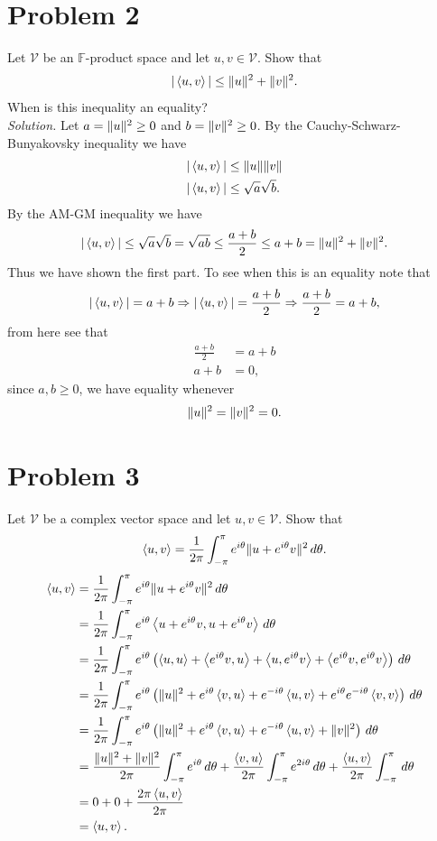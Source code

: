 \documentclass[12pt]{article}
\begin{document}
\section*{Problem 2}
Let $\mathcal{V}$ be an $\mathbb{F}$-product space and let $u, v \in \mathcal{V}$. Show that
\[
    |\left\langle u, v \right\rangle|\leq \| u \|^2+\| v \|^2.
\]
When is this inequality an equality?\\
\textit{Solution.} Let $a=\| u \|^2\geq0$ and $b=\| v \|^2\geq0$. By the Cauchy-Schwarz-Bunyakovsky inequality we have
\begin{align*}
    |\left\langle u, v \right\rangle|&\leq\| u \|\| v \|\\
    |\left\langle u, v \right\rangle|&\leq\sqrt{a}\sqrt{b}.
\end{align*}
By the AM-GM inequality we have
\[
    |\left\langle u, v \right\rangle|\leq\sqrt{a}\sqrt{b}=\sqrt{ab}\leq\frac{a+b}{2}\leq a+b=\| u \|^2+\| v \|^2.
\]
Thus we have shown the first part. To see when this is an equality note that
\[
    |\left\langle u, v \right\rangle|=a+b\Rightarrow|\left\langle u, v \right\rangle|=\frac{a+b}{2}\Rightarrow\frac{a+b}{2}=a+b,
\]
from here see that 
\begin{align*}
    \frac{a+b}{2}&=a+b\\
    a+b&=0,
\end{align*}
since $a,b\geq0$, we have equality whenever
\[
    \| u \|^2=\| v \|^2=0.
\]
\section*{Problem 3}
Let $\mathcal{V}$ be a complex vector space and let $u, v \in \mathcal{V}$. Show that
\[
    \left\langle u, v \right\rangle=\frac{1}{2\pi}\int_{-\pi}^{\pi}e^{i\theta}\| u+e^{i\theta}v \|^2\,d\theta.
\]
\begin{align*}
    \left\langle u, v \right\rangle&=\frac{1}{2\pi}\int_{-\pi}^{\pi}e^{i\theta}\| u+e^{i\theta}v \|^2\,d\theta\\
    &=\frac{1}{2\pi}\int_{-\pi}^{\pi}e^{i\theta}\left\langle u+e^{i\theta}v, u+e^{i\theta}v \right\rangle\,d\theta\\
    &=\frac{1}{2\pi}\int_{-\pi}^{\pi}e^{i\theta}\left(\left\langle u, u \right\rangle+\left\langle e^{i\theta}v, u \right\rangle+\left\langle u, e^{i\theta}v \right\rangle+\left\langle e^{i\theta}v, e^{i\theta}v \right\rangle\right)\,d\theta\\
    &=\frac{1}{2\pi}\int_{-\pi}^{\pi}e^{i\theta}\left(\| u \|^2+e^{i\theta}\left\langle v, u \right\rangle+e^{-i\theta}\left\langle u, v \right\rangle+e^{i\theta}e^{-i\theta}\left\langle v, v \right\rangle\right)\,d\theta\\
    &=\frac{1}{2\pi}\int_{-\pi}^{\pi}e^{i\theta}\left(\| u \|^2+e^{i\theta}\left\langle v, u \right\rangle+e^{-i\theta}\left\langle u, v \right\rangle+\| v \|^2\right)\,d\theta\\
    &=\frac{\| u \|^2+\| v \|^2}{2\pi}\int_{-\pi}^{\pi}e^{i\theta}\,d\theta+\frac{\left\langle v, u \right\rangle}{2\pi}\int_{-\pi}^{\pi}e^{2i\theta}\,d\theta+\frac{\left\langle u, v \right\rangle}{2\pi}\int_{-\pi}^{\pi}\,d\theta\\
    &=0+0+\frac{2\pi\left\langle u, v \right\rangle}{2\pi}\\
    &=\left\langle u, v \right\rangle.
\end{align*}
\newpage
{}
\end{document}
